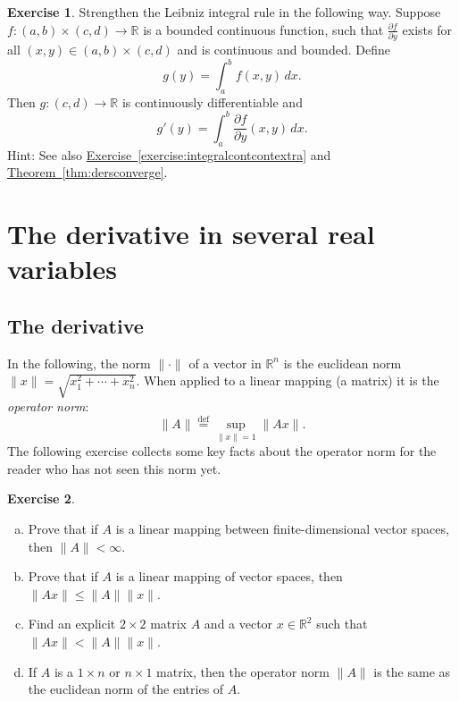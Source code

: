 \documentclass[12pt,openany]{book}
\newcommand{\snorm}[1]{\lVert {#1} \rVert}
\newcommand{\R}{{\mathbb{R}}}
\newcommand{\myindex}[1]{#1\index{#1}}
\theoremstyle{plain}
\theoremstyle{remark}
\theoremstyle{definition}
\newenvironment{exbox}{%
    \def\FrameCommand{\vrule width 1pt \relax\hspace{10pt}}%
    \MakeFramed{\advance\hsize-\width\FrameRestore}%
}{%
    \endMakeFramed
}
\newenvironment{exparts}{%
    \leavevmode\begin{enumerate}[a),noitemsep,topsep=0pt,parsep=0pt,partopsep=0pt]
}{%
    \end{enumerate}
}
\theoremstyle{exercise}
\newtheorem{exercise}{Exercise}[section]
\theoremstyle{example}
\newcommand{\exerciseref}[1]{\hyperref[#1]{Exercise~\ref*{#1}}}
\newcommand{\thmref}[1]{\hyperref[#1]{Theorem~\ref*{#1}}}
\begin{document}
\begin{exbox}
\begin{exercise} \label{exercise:strongerleibniz}
Strengthen the Leibniz integral rule in the following way.
Suppose $f \colon (a,b) \times (c,d) \to \R$ is a bounded continuous function,
such that $\frac{\partial f}{\partial y}$ exists for all $(x,y) \in (a,b)
\times (c,d)$ and is continuous and bounded.  Define
\begin{equation*}
g(y) = \int_a^b f(x,y) \,dx .
\end{equation*}
Then $g \colon (c,d) \to \R$ is continuously differentiable and
\begin{equation*}
g'(y) = \int_a^b \frac{\partial f}{\partial y}(x,y) \,dx .
\end{equation*}
Hint: See also \exerciseref{exercise:integralcontcontextra} and
\thmref{thm:dersconverge}.
\end{exercise}
\end{exbox}


\section{The derivative in several real variables} \label{sec:derinsv}

\subsection{The derivative}

In the following, the norm $\snorm{\cdot}$ of a vector in $\R^n$
is the euclidean norm
%
$\snorm{x} = \sqrt{x_1^2+\cdots+x_n^2}$.
When applied to a linear mapping (a matrix) it is the
%
\emph{\myindex{operator norm}}:
\begin{equation*}
\snorm{A} \overset{\text{def}}{=} \sup_{\snorm{x} = 1} \snorm{Ax} .
\end{equation*}
The following exercise collects some key facts about the operator norm
for the reader who has not seen this norm yet.

\begin{exbox}
\begin{exercise}
\begin{exparts} 
\item
Prove that if $A$ is a linear mapping between finite-dimensional vector
spaces, then $\snorm{A} < \infty$.
\item
Prove that if $A$ is a linear mapping of vector spaces, then
$\snorm{Ax} \leq \snorm{A} \snorm{x}$.
\item
Find an explicit $2 \times 2$ matrix $A$ and a vector $x \in \R^2$
such that $\snorm{Ax} < \snorm{A} \snorm{x}$.
\item
If $A$ is a $1 \times n$ or $n \times 1$ matrix, then the operator norm
$\snorm{A}$ is the same as the euclidean norm of the entries of $A$.
\end{exparts} 
\end{exercise}
\end{exbox}
\end{document}
